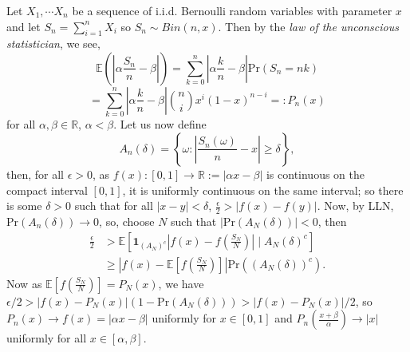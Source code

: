 \documentclass[landscape,final,a0paper]{baposter}
\begin{document}
\begin{poster}
{Let $X_1, \cdots X_n$ be a sequence of i.i.d. Bernoulli random variables with parameter $x$ and let $S_n = \sum_{i= 1}^n X_i$ so $S_n \sim Bin(n, x)$. Then by the \textit{law of the unconscious statistician}, we see, 
$$
\mathbb{E}\left(\left| \alpha \frac{S_n}{n} - \beta \right| \right) = \sum_{k=0}^n \left| \alpha \frac{k}{n} - \beta \right|\text{Pr}\left(S_n = nk\right)
$$ 
\vspace{-3mm}$$
 = \sum_{k=0}^n \left| \alpha \frac{k}{n} - \beta \right| \binom{n}{i} x^i (1 - x)^{n - i} =: P_n(x)
$$
for all $\alpha, \beta \in \mathbb{R}$, $\alpha < \beta$. Let us now define
$$ A_n(\delta) = \left\{\omega : \left| \frac{S_n(\omega)}{n} - x \right| \ge \delta \right\},$$
then, for all $\epsilon > 0$, as $f(x) : [0, 1] \to \mathbb{R} := \left| \alpha x - \beta \right|$ is continuous on the compact interval $[0, 1]$, it is uniformly continuous on the same interval; so there is some $\delta > 0$ such that for all $\left| x - y \right| < \delta$,  $\frac{\epsilon}{2} > \left| f(x) - f(y) \right|$. Now, by LLN, $\text{Pr}(A_n (\delta)) \to 0$, so, choose $N $ such that $\left|\text{Pr}(A_N(\delta)) \right| < 0$, then
\begin{align*}
\frac{\epsilon}{2} & > \mathbb{E} \left[ \mathbf{1}_{(A_N)^c}\left| f(x) - f \left(\frac{S_N}{N}\right) \right| \mid A_N(\delta)^c \right] \\
& \ge \left| f(x) - \mathbb{E} \left[f \left(\frac{S_N}{N}\right) \right] \right| \text{Pr}((A_N(\delta))^c).
\end{align*}
Now as $\mathbb{E} \left[f \left(\frac{S_N}{N}\right) \right] = P_N(x)$, we have $\epsilon/ 2 > \left|f(x) - P_N(x)\right| (1 - \text{Pr}(A_N(\delta))) > \left|f(x) - P_N(x)\right|/2$, so $P_n(x) \to f(x) = \left| \alpha x - \beta \right|$ uniformly for $x\in [0,1]$ and $P_n(\frac{x + \beta}{\alpha}) \to \left| x \right|$ uniformly for all $x \in [\alpha, \beta]$.


\vspace{0.3em}
 }

\end{poster}
\end{document}
